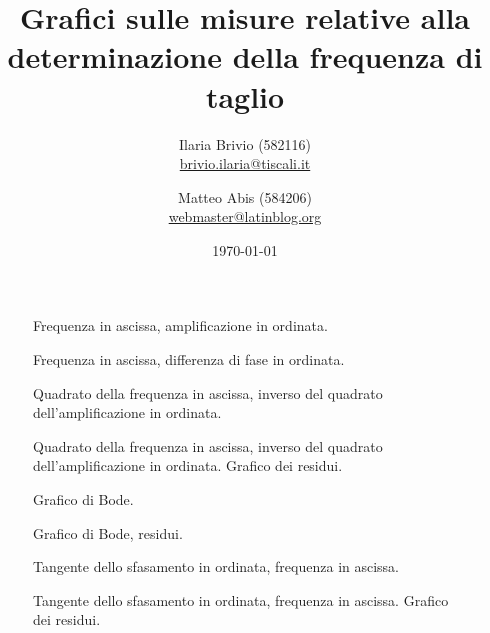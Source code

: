 \documentclass[italian,a4paper]{article}
\begin{document}
\title{Grafici sulle misure relative alla determinazione della frequenza di taglio}
\author{\normalsize Ilaria Brivio (582116)\\%
\normalsize \url{brivio.ilaria@tiscali.it}%
\and %
\normalsize Matteo Abis (584206)\\ %
\normalsize \url{webmaster@latinblog.org}}
\date{\today}
\maketitle
\begin{figure}[p]\caption{Frequenza in ascissa, amplificazione in ordinata.}
\centering

\end{figure}

\begin{figure}[p]\caption{Frequenza in ascissa, differenza di fase in ordinata.}
\centering

\end{figure}

\begin{figure}[p]\caption{Quadrato della frequenza in ascissa, inverso del quadrato dell'amplificazione in ordinata.}
\centering

\end{figure}

\begin{figure}[p]\caption{Quadrato della frequenza in ascissa, inverso del quadrato dell'amplificazione in ordinata. Grafico dei residui.}
\centering

\end{figure}

\begin{figure}[p]\caption{Grafico di Bode.}
\centering

\end{figure}

\begin{figure}[p]\caption{Grafico di Bode, residui.}
\centering

\end{figure}

\begin{figure}[p]\caption{Tangente dello sfasamento in ordinata, frequenza in ascissa.}
\centering

\end{figure}

\begin{figure}[p]\caption{Tangente dello sfasamento in ordinata, frequenza in ascissa. Grafico dei residui.}
\centering

\end{figure}
\end{document}
